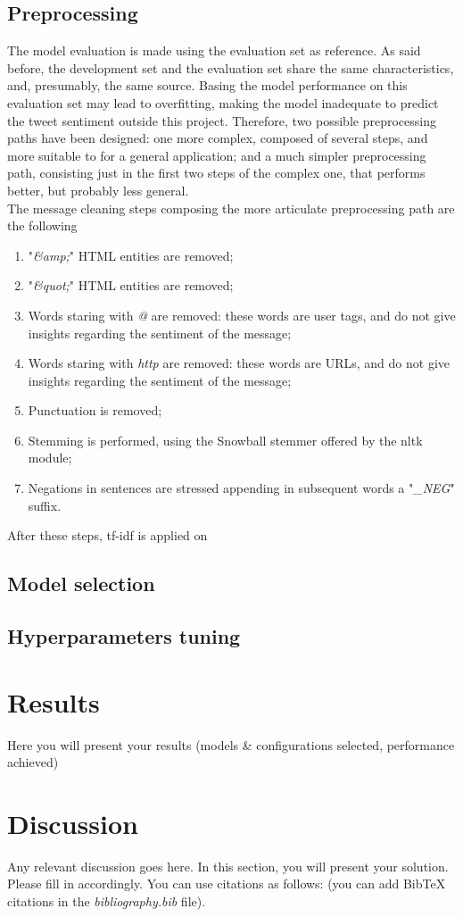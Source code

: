\documentclass[conference]{IEEEtran}
\begin{document}
\subsection{Preprocessing}
The model evaluation is made using the evaluation set as reference. As said before, the development set and the evaluation set share the same characteristics, and, presumably, the same source. Basing the model performance on this evaluation set may lead to overfitting, making the model inadequate to predict the tweet sentiment outside this project. Therefore, two possible preprocessing paths have been designed: one more complex, composed of several steps, and more suitable to for a general application; and a much simpler preprocessing path, consisting just in the first two steps of the complex one, that performs better, but probably less general. \\
The message cleaning steps composing the more articulate preprocessing path are the following
\begin{enumerate}
    \item "\textit{\&amp;}" HTML entities are removed;
    \item "\textit{\&quot;}" HTML entities are removed; 
    \item Words staring with \textit{@} are removed: these words are user tags, and do not give insights regarding the sentiment of the message; 
    \item Words staring with \textit{http} are removed: these words are URLs, and do not give insights regarding the sentiment of the message;
    \item Punctuation is removed;
    \item Stemming is performed, using the Snowball stemmer offered by the nltk module;
    \item Negations in sentences are stressed appending in subsequent words a "\textit{\_NEG}" suffix.
\end{enumerate}
After these steps, tf-idf is applied on 
\subsection{Model selection}
\subsection{Hyperparameters tuning}

\section{Results}
Here you will present your results (models \& configurations selected, performance achieved)

\section{Discussion}
Any relevant discussion goes here.
In this section, you will present your solution. Please fill in accordingly.
You can use citations as follows: \cite{goodfellow2016deep} (you can add BibTeX citations in the \textit{bibliography.bib} file).



\end{document}
